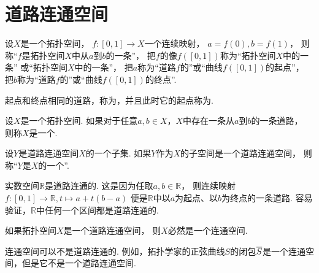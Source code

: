 \section{道路连通空间}
\begin{definition}
设\(X\)是一个拓扑空间，
\(f\colon [0,1] \to X\)一个连续映射，
\(a=f(0),
b=f(1)\)，
则称“\(f\)是拓扑空间\(X\)中从\(a\)到\(b\)的一条”，
把\(f\)的像\(f([0,1])\)称为“拓扑空间\(X\)中的一条”
或“拓扑空间\(X\)中的一条”，
把\(a\)称为“道路\(f\)的”或“曲线\(f([0,1])\)的{起点}”，
把\(b\)称为“道路\(f\)的”或“曲线\(f([0,1])\)的{终点}”.
\end{definition}

\begin{definition}
起点和终点相同的道路，称为，并且此时它的起点称为.
\end{definition}

\begin{definition}
设\(X\)是一个拓扑空间.
如果对于任意\(a,b \in X\)，\(X\)中存在一条从\(a\)到\(b\)的一条道路，
则称\(X\)是一个.
\end{definition}

\begin{definition}
设\(Y\)是道路连通空间\(X\)的一个子集.
如果\(Y\)作为\(X\)的子空间是一个道路连通空间，
则称“\(Y\)是\(X\)的一个”.
\end{definition}

实数空间\(\mathbb{R}\)是道路连通的.
这是因为任取\(a,b \in \mathbb{R}\)，
则连续映射\(f\colon [0,1] \to \mathbb{R}, t \mapsto a+t(b-a)\)
便是\(\mathbb{R}\)中以\(a\)为起点、以\(b\)为终点的一条道路.
容易验证，\(\mathbb{R}\)中任何一个区间都是道路连通的.

\begin{theorem}\label{theorem:道路连通空间.道路连通空间一定是连通空间}
如果拓扑空间\(X\)是一个道路连通空间，
则\(X\)必然是一个连通空间.
\end{theorem}

连通空间可以不是道路连通的.
例如，拓扑学家的正弦曲线\(S\)的闭包\(\overline{S}\)是一个连通空间，但是它不是一个道路连通空间.

